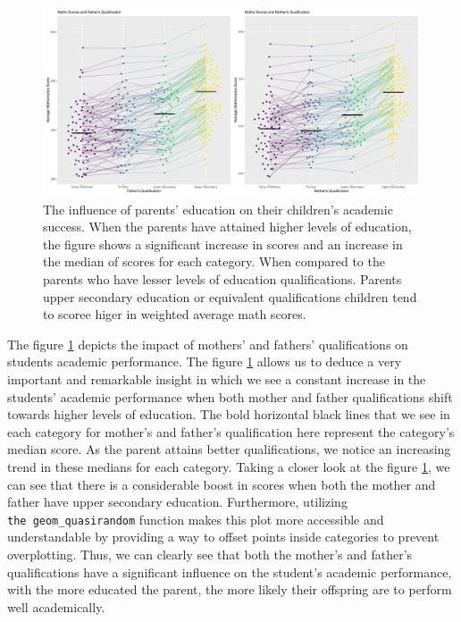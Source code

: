 \begin{Schunk}
\begin{figure}[H]
\includegraphics[width=1\linewidth]{learningtower_files/figure-latex/qual-plot-1} \caption[The influence of parents' education on their children's academic success]{The influence of parents' education on their children's academic success. When the parents have attained higher levels of education, the figure shows a significant increase in scores and an increase in the median of scores for each category. When compared to the parents who have lesser levels of education qualifications. Parents upper secondary education or equivalent qualifications children tend to scoree higer in weighted average math scores.}\label{fig:qual-plot}
\end{figure}
\end{Schunk}

The figure \ref{fig:qual-plot} depicts the impact of mothers' and
fathers' qualifications on students academic performance. The figure
\ref{fig:qual-plot} allows us to deduce a very important and remarkable
insight in which we see a constant increase in the students' academic
performance when both mother and father qualifications shift towards
higher levels of education. The bold horizontal black lines that we see
in each category for mother's and father's qualification here represent
the category's median score. As the parent attains better
qualifications, we notice an increasing trend in these medians for each
category. Taking a closer look at the figure \ref{fig:qual-plot}, we can
see that there is a considerable boost in scores when both the mother
and father have upper secondary education. Furthermore, utilizing
\texttt{the\ geom\_quasirandom} function makes this plot more accessible
and understandable by providing a way to offset points inside categories
to prevent overplotting. Thus, we can clearly see that both the mother's
and father's qualifications have a significant influence on the
student's academic performance, with the more educated the parent, the
more likely their offspring are to perform well academically.

